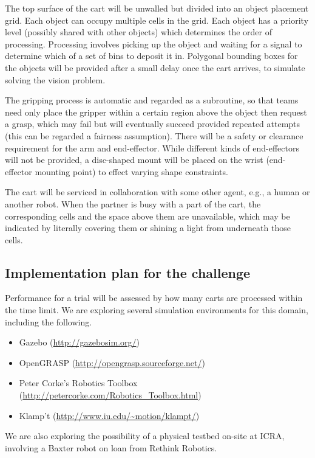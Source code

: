 \documentclass{amsart}
\theoremstyle{definition}
\begin{document}
The top surface of the cart will be unwalled but divided into an object placement grid. Each 
object can occupy multiple cells in the grid. Each object has a priority level (possibly shared 
with other objects) which determines the order of processing. Processing involves picking up
the object and waiting for a signal to determine which of a set of bins to deposit it in. Polygonal 
bounding boxes for the objects will be provided after a small delay once the cart arrives, to simulate 
solving the vision problem. 

The gripping process is automatic and regarded as a subroutine, so that teams need only place 
the gripper within a certain region above the object then request a grasp, which may fail but 
will eventually succeed provided repeated attempts (this can be regarded a fairness assumption).
There will be a safety or clearance requirement for the arm and end-effector.  While different kinds 
of end-effectors will not be provided, a disc-shaped mount will be placed on the wrist (end-effector 
mounting point) to effect varying shape constraints.

The cart will be serviced in collaboration with some other agent, e.g., a human or another robot.
When the partner is busy with a part of the cart, the corresponding cells and the space above them 
are unavailable, which may be indicated by literally covering them or shining a light from underneath 
those cells.


\subsection{Implementation plan for the challenge}

Performance for a trial will be assessed by how many carts are processed within the time limit.
We are exploring several simulation environments for this domain, including the following.
\begin{itemize}
\item Gazebo (\url{http://gazebosim.org/})
\item OpenGRASP (\url{http://opengrasp.sourceforge.net/})
\item Peter Corke's Robotics Toolbox
(\url{http://petercorke.com/Robotics_Toolbox.html})
\item Klamp't (\url{http://www.iu.edu/~motion/klampt/})
\end{itemize}

We are also exploring the possibility of a physical testbed on-site at ICRA, involving a Baxter robot
on loan from Rethink Robotics.




\end{document}
